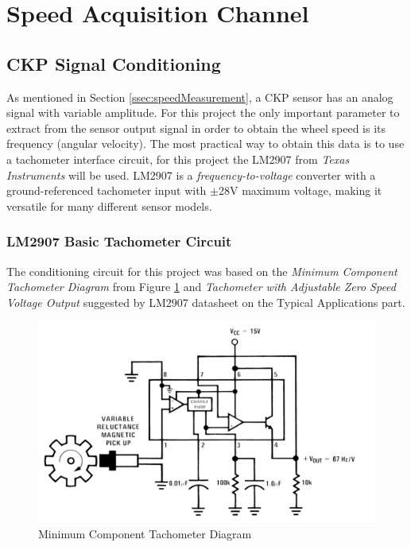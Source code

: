 \section{Speed Acquisition Channel}\label{sec:speed-acquisition-channel}

	\subsection{CKP Signal Conditioning}\label{ssec:ckp-signal-conditioning-circuit}

		As mentioned in Section \ref{ssec:speedMeasurement}, a CKP sensor has an analog signal with variable amplitude. For this project the only important parameter to extract from the sensor output signal in order to obtain the wheel speed is its frequency (angular velocity). The most practical way to obtain this data is to use a tachometer interface circuit, for this project the LM2907 from \textit{Texas Instruments} \cite{lm2907-datasheet} will be used. LM2907 is a \textit{frequency-to-voltage} converter with a ground-referenced tachometer input with $\pm$28V maximum voltage, making it versatile for many different sensor models.
		
		\subsubsection{LM2907 Basic Tachometer Circuit}\label{sssec:lm2907-basic-tachometer-circuit}
			The conditioning circuit for this project was based on the \textit{Minimum Component Tachometer Diagram } from Figure \ref{fig:lm2907-minimum-component-tachometer-diagram} and \textit{Tachometer with Adjustable Zero Speed Voltage Output} suggested by LM2907 datasheet  \cite{lm2907-datasheet} on the Typical Applications part.

			\begin{figure}[htbp]
				\centering
				\includegraphics[width=.8\textwidth]{figuras/fig-lm2907-minimum-component-tachometer-diagram}
				\caption{Minimum Component Tachometer Diagram \cite{lm2907-datasheet}}
				\label{fig:lm2907-minimum-component-tachometer-diagram}
			\end{figure}

